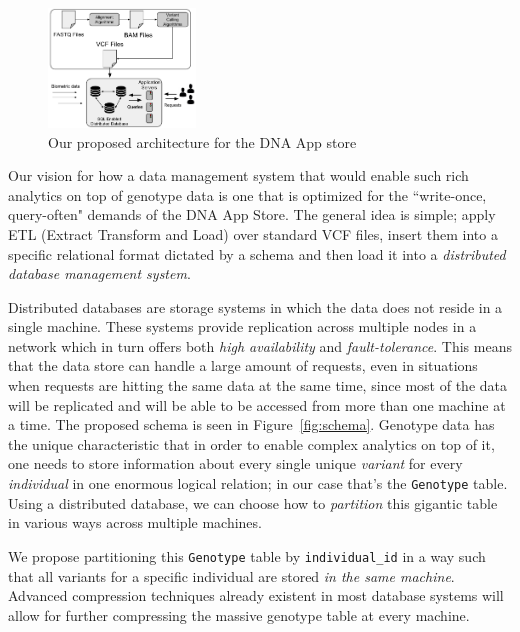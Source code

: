 \documentclass[conference,twocolumn,10pt]{IEEEtran}
\begin{document}
\begin{figure}[t]
    \centering
    \includegraphics[width=0.35\textwidth]{proposed-pipeline}
    \caption{Our proposed architecture for the DNA App store}
    \label{fig:proposed}
    \vspace{-10pt}
\end{figure}

Our vision for how a data management system that would enable such rich analytics on top of genotype data is one that is optimized for the ``write-once, query-often" demands of the DNA App Store. The general idea is simple; apply ETL (Extract Transform and Load) over standard VCF files, insert them into a specific relational format dictated by a schema and then load it into a \textit{distributed database management system}.

Distributed databases are storage systems in which the data does not reside in a single machine. These systems provide replication across multiple nodes in a network which in turn offers both \textit{high availability} and \textit{fault-tolerance}. This means that the data store can handle a large amount of requests, even in situations when requests are hitting the same data at the same time, since most of the data will be replicated and will be able to be accessed from more than one machine at a time. The proposed schema is seen in Figure~\ref{fig:schema}. Genotype data has the unique characteristic that in order to enable complex analytics on top of it, one needs to store information about every single unique \textit{variant} for every \textit{individual} in one enormous logical relation; in our case that's the \texttt{Genotype} table. Using a distributed database, we can choose how to \textit{partition} this gigantic table in various ways across multiple machines.

We propose partitioning this \texttt{Genotype} table by \texttt{individual\_id} in a way such that all variants for a specific individual are stored \textit{in the same machine}. Advanced compression techniques already existent in most database systems will allow for further compressing the massive genotype table at every machine.
\end{document}
